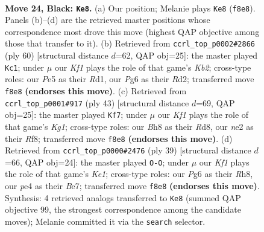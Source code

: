 \documentclass[11pt]{article}
\begin{document}
\clearpage

\begin{figure}[p]\centering
\begin{subfigure}{0.46\textwidth}\centering
\resizebox{\linewidth}{!}{%
\newchessgame
\chessboard[
  setfen={r1r2knb/p2n1p1p/P1p3p1/2P1p3/4P2P/4BP2/4N1B1/R4RK1 b - - 4 24},
  showmover=false,
  pgfstyle=straightmove, color=movearrow, markmove={f8-e8}
]}
\caption{}
\end{subfigure}\hfill
\begin{subfigure}{0.46\textwidth}\centering
\resizebox{\linewidth}{!}{%
\newchessgame
\chessboard[
  setfen={4rr2/1kp4p/2b5/p1p2p2/P1P1pP2/1P2N1P1/1K1R3P/3R4 w - - 10 31},
  showmover=false,
  pgfstyle=straightmove, color=movearrow, markmove={b2-c1}
]}
\caption{}
\end{subfigure}
\\[4pt]
\begin{subfigure}{0.46\textwidth}\centering
\resizebox{\linewidth}{!}{%
\newchessgame
\chessboard[
  setfen={3r1rk1/7p/1p1nbp2/pPp2p2/P7/4P3/3NBPPP/2RRK3 b - - 1 22},
  showmover=false,
  pgfstyle=straightmove, color=movearrow, markmove={g8-f7}
]}
\caption{}
\end{subfigure}\hfill
\begin{subfigure}{0.46\textwidth}\centering
\resizebox{\linewidth}{!}{%
\newchessgame
\chessboard[
  setfen={r3k2r/p3bpp1/2p1p2p/7P/2NPn3/4B3/PP3PP1/2KR3R b kq - 0 20},
  showmover=false,
  pgfstyle=straightmove, color=movearrow, markmove={e8-g8}
]}
\caption{}
\end{subfigure}
\caption{\textbf{Move 24, Black: \texttt{Ke8}.} (a) Our position; Melanie plays \texttt{Ke8} (\texttt{f8e8}). Panels (b)--(d) are the retrieved master positions whose correspondence most drove this move (highest QAP objective among those that transfer to it). (b) Retrieved from \texttt{ccrl\_top\_p0002\#2866} (ply 60) [structural distance $d$=62, QAP obj=25]: the master played \texttt{Kc1}; under $\mu$ our \emph{Kf1} plays the role of that game's \emph{Kb2}; cross-type roles: our \emph{P}e5 as their \emph{R}d1, our \emph{P}g6 as their \emph{R}d2; transferred move \texttt{f8e8} \textbf{(endorses this move)}. (c) Retrieved from \texttt{ccrl\_top\_p0001\#917} (ply 43) [structural distance $d$=69, QAP obj=25]: the master played \texttt{Kf7}; under $\mu$ our \emph{Kf1} plays the role of that game's \emph{Kg1}; cross-type roles: our \emph{B}h8 as their \emph{R}d8, our \emph{n}e2 as their \emph{R}f8; transferred move \texttt{f8e8} \textbf{(endorses this move)}. (d) Retrieved from \texttt{ccrl\_top\_p0000\#2476} (ply 39) [structural distance $d$=66, QAP obj=24]: the master played \texttt{O-O}; under $\mu$ our \emph{Kf1} plays the role of that game's \emph{Ke1}; cross-type roles: our \emph{P}g6 as their \emph{R}h8, our \emph{p}e4 as their \emph{B}e7; transferred move \texttt{f8e8} \textbf{(endorses this move)}. Synthesis: 4 retrieved analogs transferred to \texttt{Ke8} (summed QAP objective 99, the strongest correspondence among the candidate moves); Melanie committed it via the \texttt{search} selector.}
\label{fig:thought-m47}
\end{figure}
\end{document}
